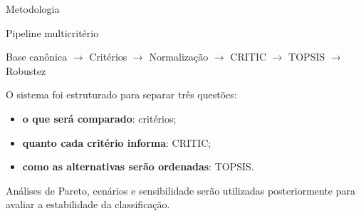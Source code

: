 %
%
%
%
%
%



\begin{frame}{Metodologia}

    \begin{block}{Pipeline multicritério}
        \centering

        Base canônica
        $\rightarrow$
        Critérios
        $\rightarrow$
        Normalização
        $\rightarrow$
        CRITIC
        $\rightarrow$
        TOPSIS
        $\rightarrow$
        Robustez
    \end{block}

    \vspace{0.4cm}

    O sistema foi estruturado para separar três questões:

    \begin{itemize}
        \item \textbf{o que será comparado}: critérios;
        \item \textbf{quanto cada critério informa}: CRITIC;
        \item \textbf{como as alternativas serão ordenadas}: TOPSIS.
    \end{itemize}

    \vspace{0.3cm}

    Análises de Pareto, cenários e sensibilidade serão utilizadas
    posteriormente para avaliar a estabilidade da classificação.

\end{frame}



